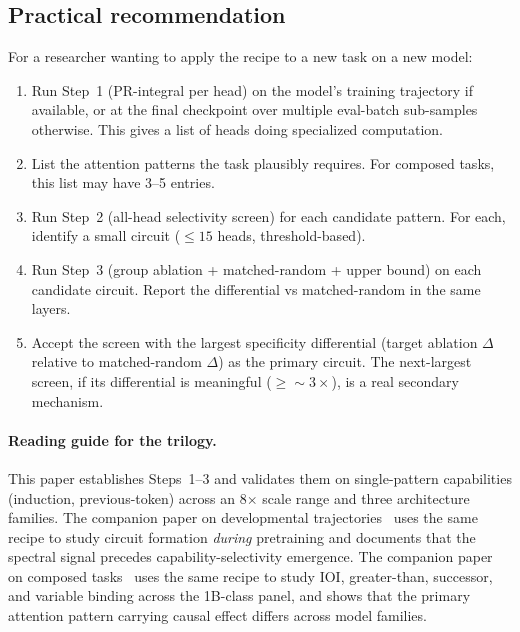 \documentclass[11pt]{article}
\begin{document}
\subsection{Practical recommendation}

For a researcher wanting to apply the recipe to a new task on a new model:

\begin{enumerate}[leftmargin=*,topsep=2pt,itemsep=2pt]
\item Run Step~1 (PR-integral per head) on the model's training trajectory if available, or at the final checkpoint over multiple eval-batch sub-samples otherwise. This gives a list of heads doing specialized computation.
\item List the attention patterns the task plausibly requires. For composed tasks, this list may have 3--5 entries.
\item Run Step~2 (all-head selectivity screen) for each candidate pattern. For each, identify a small circuit ($\leq 15$ heads, threshold-based).
\item Run Step~3 (group ablation + matched-random + upper bound) on each candidate circuit. Report the differential vs matched-random in the same layers.
\item Accept the screen with the largest specificity differential (target ablation $\Delta$ relative to matched-random $\Delta$) as the primary circuit. The next-largest screen, if its differential is meaningful ($\geq \sim 3\times$), is a real secondary mechanism.
\end{enumerate}

\paragraph{Reading guide for the trilogy.} This paper establishes Steps~1--3 and validates them on single-pattern capabilities (induction, previous-token) across an 8$\times$ scale range and three architecture families. The companion paper on developmental trajectories~\citep{paper2_developmental} uses the same recipe to study circuit formation \emph{during} pretraining and documents that the spectral signal precedes capability-selectivity emergence. The companion paper on composed tasks~\citep{paper3_circuits} uses the same recipe to study IOI, greater-than, successor, and variable binding across the 1B-class panel, and shows that the primary attention pattern carrying causal effect differs across model families.


\end{document}
